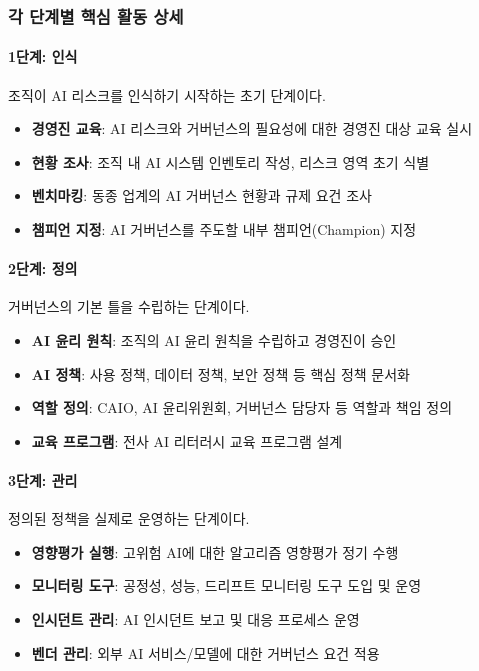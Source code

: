 \subsubsection{각 단계별 핵심 활동 상세}

\paragraph{1단계: 인식}
조직이 AI 리스크를 인식하기 시작하는 초기 단계이다.

\begin{itemize}
 \item \textbf{경영진 교육}: AI 리스크와 거버넌스의 필요성에 대한 경영진 대상 교육 실시
 \item \textbf{현황 조사}: 조직 내 AI 시스템 인벤토리 작성, 리스크 영역 초기 식별
 \item \textbf{벤치마킹}: 동종 업계의 AI 거버넌스 현황과 규제 요건 조사
 \item \textbf{챔피언 지정}: AI 거버넌스를 주도할 내부 챔피언(Champion) 지정
\end{itemize}

\paragraph{2단계: 정의}
거버넌스의 기본 틀을 수립하는 단계이다.

\begin{itemize}
 \item \textbf{AI 윤리 원칙}: 조직의 AI 윤리 원칙을 수립하고 경영진이 승인
 \item \textbf{AI 정책}: 사용 정책, 데이터 정책, 보안 정책 등 핵심 정책 문서화
 \item \textbf{역할 정의}: CAIO, AI 윤리위원회, 거버넌스 담당자 등 역할과 책임 정의
 \item \textbf{교육 프로그램}: 전사 AI 리터러시 교육 프로그램 설계
\end{itemize}

\paragraph{3단계: 관리}
정의된 정책을 실제로 운영하는 단계이다.

\begin{itemize}
 \item \textbf{영향평가 실행}: 고위험 AI에 대한 알고리즘 영향평가 정기 수행
 \item \textbf{모니터링 도구}: 공정성, 성능, 드리프트 모니터링 도구 도입 및 운영
 \item \textbf{인시던트 관리}: AI 인시던트 보고 및 대응 프로세스 운영
 \item \textbf{벤더 관리}: 외부 AI 서비스/모델에 대한 거버넌스 요건 적용
\end{itemize}

